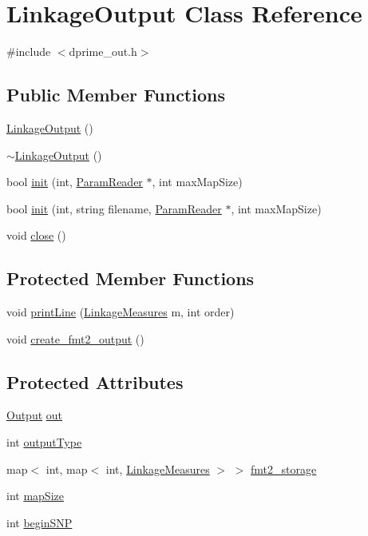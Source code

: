 \hypertarget{classLinkageOutput}{
\section{LinkageOutput Class Reference}
\label{classLinkageOutput}
}


{\ttfamily \#include $<$dprime\_\-out.h$>$}

\subsection*{Public Member Functions}
\begin{DoxyCompactItemize}
\item 
\hyperlink{classLinkageOutput_abc8ce9e012b6b659931451b78d43ff1d}{LinkageOutput} ()
\item 
\hyperlink{classLinkageOutput_a931ff7e88c2f277cb22825426667ee1d}{$\sim$LinkageOutput} ()
\item 
bool \hyperlink{classLinkageOutput_a5ede81b8e05550065e1914183c3333dc}{init} (int, \hyperlink{classParamReader}{ParamReader} $\ast$, int maxMapSize)
\item 
bool \hyperlink{classLinkageOutput_a656d4a5dec84bb23f3bbf98aef753f12}{init} (int, string filename, \hyperlink{classParamReader}{ParamReader} $\ast$, int maxMapSize)
\item 
void \hyperlink{classLinkageOutput_a26276f1a377014bd7a4cd851397daca2}{close} ()
\end{DoxyCompactItemize}
\subsection*{Protected Member Functions}
\begin{DoxyCompactItemize}
\item 
void \hyperlink{classLinkageOutput_aac04c2920f8bde831a448e49f1ac170f}{printLine} (\hyperlink{structLinkageMeasures}{LinkageMeasures} m, int order)
\item 
void \hyperlink{classLinkageOutput_a2b5c651367922b51027f2ceae3244dc2}{create\_\-fmt2\_\-output} ()
\end{DoxyCompactItemize}
\subsection*{Protected Attributes}
\begin{DoxyCompactItemize}
\item 
\hyperlink{classOutput}{Output} \hyperlink{classLinkageOutput_a5ec16dbe108da0445df84a95839637d6}{out}
\item 
int \hyperlink{classLinkageOutput_a8f1a7689bf42f566a0efcd602023937d}{outputType}
\item 
map$<$ int, map$<$ int, \hyperlink{structLinkageMeasures}{LinkageMeasures} $>$ $>$ \hyperlink{classLinkageOutput_aa9c87193fee4917ca92ac64e72bedf61}{fmt2\_\-storage}
\item 
int \hyperlink{classLinkageOutput_aac75f7a820c77bb69abc5ee925d6e56d}{mapSize}
\item 
int \hyperlink{classLinkageOutput_a414495118232cbda3297645f8eabd538}{beginSNP}
\end{DoxyCompactItemize}

